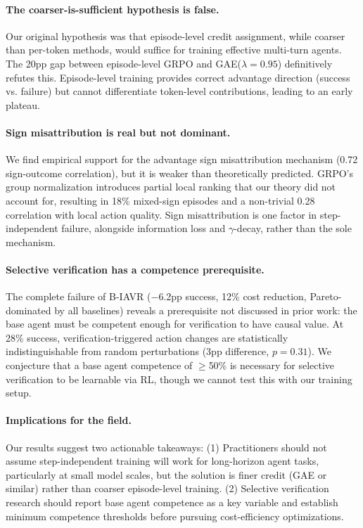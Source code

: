 \documentclass[11pt]{article}
\begin{document}
\paragraph{The coarser-is-sufficient hypothesis is false.}
Our original hypothesis was that episode-level credit assignment, while coarser than per-token methods, would suffice for training effective multi-turn agents.
The 20pp gap between episode-level GRPO and GAE($\lambda{=}0.95$) definitively refutes this.
Episode-level training provides correct advantage direction (success vs. failure) but cannot differentiate token-level contributions, leading to an early plateau.

\paragraph{Sign misattribution is real but not dominant.}
We find empirical support for the advantage sign misattribution mechanism (0.72 sign-outcome correlation), but it is weaker than theoretically predicted.
GRPO's group normalization introduces partial local ranking that our theory did not account for, resulting in 18\% mixed-sign episodes and a non-trivial 0.28 correlation with local action quality.
Sign misattribution is one factor in step-independent failure, alongside information loss and $\gamma$-decay, rather than the sole mechanism.

\paragraph{Selective verification has a competence prerequisite.}
The complete failure of B-IAVR ($-$6.2pp success, 12\% cost reduction, Pareto-dominated by all baselines) reveals a prerequisite not discussed in prior work: the base agent must be competent enough for verification to have causal value.
At 28\% success, verification-triggered action changes are statistically indistinguishable from random perturbations (3pp difference, $p = 0.31$).
We conjecture that a base agent competence of $\geq$50\% is necessary for selective verification to be learnable via RL, though we cannot test this with our training setup.

\paragraph{Implications for the field.}
Our results suggest two actionable takeaways:
(1) Practitioners should not assume step-independent training will work for long-horizon agent tasks, particularly at small model scales, but the solution is finer credit (GAE or similar) rather than coarser episode-level training.
(2) Selective verification research should report base agent competence as a key variable and establish minimum competence thresholds before pursuing cost-efficiency optimizations.
\end{document}
